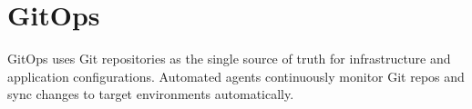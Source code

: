 \section{GitOps}
GitOps uses Git repositories as the single source of truth for infrastructure and application configurations. Automated agents continuously monitor Git repos and sync changes to target environments automatically.
